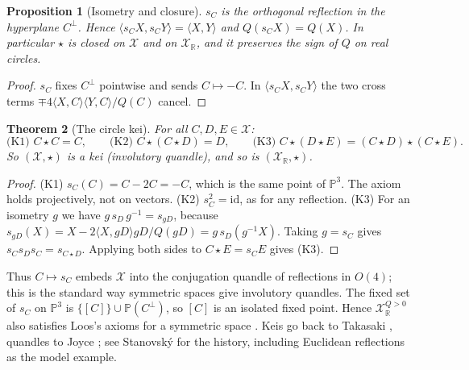 \documentclass[10pt]{article}
\newtheorem{theorem}{Theorem}\newtheorem{proposition}[theorem]{Proposition}\newtheorem{lemma}[theorem]{Lemma}
\theoremstyle{definition}\newtheorem{definition}[theorem]{Definition}\newtheorem{remark}[theorem]{Remark}
\newcommand{\ip}[2]{\langle #1,#2\rangle}
\begin{document}
\begin{proposition}[Isometry and closure]\label{p:iso}
$s_C$ is the orthogonal reflection in the hyperplane $C^\perp$. Hence $\ip{s_CX}{s_CY}=\ip XY$ and $Q(s_CX)=Q(X)$.
In particular $\star$ is closed on $\mathcal X$ and on $\mathcal X_{\mathbb R}$, and it preserves the sign of $Q$ on real circles.
\end{proposition}
\begin{proof}
$s_C$ fixes $C^\perp$ pointwise and sends $C\mapsto -C$. In $\ip{s_CX}{s_CY}$ the two cross terms $\mp4\ip XC\ip YC/Q(C)$ cancel.
\end{proof}

\begin{theorem}[The circle kei]\label{t:kei}
For all $C,D,E\in\mathcal X$:
\[\text{(K1) } C\star C=C,\qquad\text{(K2) } C\star(C\star D)=D,\qquad\text{(K3) } C\star(D\star E)=(C\star D)\star(C\star E).\]
So $(\mathcal X,\star)$ is a kei (involutory quandle), and so is $(\mathcal X_{\mathbb R},\star)$.
\end{theorem}
\begin{proof}
(K1) $s_C(C)=C-2C=-C$, which is the same point of $\mathbb P^3$. The axiom holds projectively, not on vectors.
(K2) $s_C^2=\mathrm{id}$, as for any reflection.
(K3) For an isometry $g$ we have $g\,s_D\,g^{-1}=s_{gD}$, because $s_{gD}(X)=X-2\ip X{gD}gD/Q(gD)=g\,s_D(g^{-1}X)$. Taking $g=s_C$ gives $s_C s_D s_C=s_{C\star D}$. Applying both sides to $C\star E=s_CE$ gives (K3).
\end{proof}
Thus $C\mapsto s_C$ embeds $\mathcal X$ into the conjugation quandle of reflections in $O(4)$; this is the standard way symmetric spaces give involutory quandles.
The fixed set of $s_C$ on $\mathbb P^3$ is $\{[C]\}\cup\mathbb P(C^\perp)$, so $[C]$ is an isolated fixed point. Hence $\mathcal X_{\mathbb R}^{Q>0}$ also satisfies Loos's axioms for a symmetric space \cite{Loos67,Loos69}.
Keis go back to Takasaki \cite{Tak43}, quandles to Joyce \cite{Joy82}; see Stanovsk\'y \cite{Sta15} for the history, including Euclidean reflections as the model example.
\end{document}
